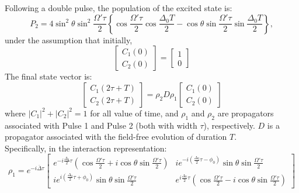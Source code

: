 \documentclass{article}
\begin{document}
	
\noindent 
Following a double pulse, the population of the excited state is:
\begin{equation*}
P_2 = 4\sin^{2}\theta\sin^{2}\frac{\Omega'\tau}{2} \left\lbrace \cos \frac{\Omega'\tau}{2}\cos \frac{\Delta_0 T}{2} - \cos\theta\sin\frac{\Omega'\tau}{2} \sin \frac{\Delta_0 T}{2}\right\rbrace, 
\end{equation*}
\noindent 
under the assumption that initially,
\[
\begin{bmatrix}
C_1(0)\\C_2(0)
\end{bmatrix}
=
\begin{bmatrix}
1\\0
\end{bmatrix}
\]
\noindent 
The final state vector is:
\[
\begin{bmatrix}
C_1(2\tau+T)\\C_2(2\tau+T)
\end{bmatrix}
=
\rho_2 D \rho_1
\begin{bmatrix}
C_1(0)\\C_2(0)
\end{bmatrix}
\]
where $|C_1|^2 + |C_2|^2 = 1$ for all value of time, and $\rho_1$ and $\rho_2$ are propagators associated with Pulse 1 and Pulse 2 (both with width $\tau$), respectively. $D$ is a propagator associated with the field-free evolution of duration $T$.\\

\noindent Specifically, in the interaction representation:
\[
\rho_1 = e^{-i\overline\Delta\tau}
\begin{bmatrix}
e^{-i\frac{\Delta_0}{2}\tau}\left(\cos\frac{\Omega'\tau}{2} + i\cos\theta\sin\frac{\Omega'\tau}{2}\right)  
& ie^{-i\left(\frac{\Delta_0}{2}\tau - \phi_0 \right)} \sin\theta\sin\frac{\Omega'\tau}{2} 
\\
ie^{i\left(\frac{\Delta_0}{2}\tau + \phi_0 \right)} \sin\theta\sin\frac{\Omega'\tau}{2} 
& 
e^{i\frac{\Delta_0}{2}\tau}\left(\cos\frac{\Omega'\tau}{2} - i\cos\theta\sin\frac{\Omega'\tau}{2}\right)  
\end{bmatrix}\]
\end{document}
